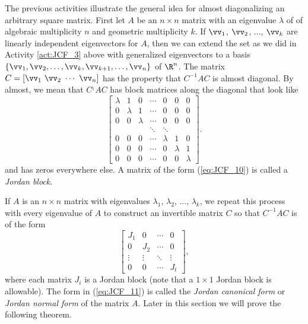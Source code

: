 The previous activities illustrate the general idea for almost diagonalizing an arbitrary square matrix. First let $A$ be an $n \times n$ matrix with an eigenvalue $\lambda$ of  of algebraic multiplicity $n$ and geometric multiplicity $k$. If $\vv_1$, $\vv_2$, $\ldots$, $\vv_k$ are linearly independent eigenvectors for $A$, then we can extend the set as we did in Activity \ref{act:JCF_3} above with generalized eigenvectors to a basis $\{\vv_1, \vv_2, \ldots, \vv_k, \vv_{k+1}, \ldots, \vv_n\}$ of $\R^n$. The matrix $C = [\vv_1 \ \vv_2 \ \cdots \ \vv_n]$ has the property that $C^{-1}AC$ is almost diagonal. By almost, we mean that $C^{_1}AC$ has block matrices along the diagonal that look like 
\begin{equation} \label{eq:JCF_10}
\left[ \begin{array}{ccccccc} \lambda&1&0 &\cdots&0&0&0 \\ 0&\lambda&1&\cdots&0&0&0 \\ 0&0&\lambda&\cdots&0&0&0 \\ &&&\ddots&\ddots&& \\ 0&0&0&\cdots&\lambda&1&0 \\ 0&0&0&\cdots&0&\lambda&1 \\  0&0&0&\cdots&0&0&\lambda \end{array} \right].
\end{equation}
and has zeros everywhere else. A matrix of the form (\ref{eq:JCF_10}) is called a \emph{Jordan block}. 

If $A$ is an $n \times n$ matrix with eigenvalues $\lambda_1$, $\lambda_2$, $\ldots$, $\lambda_k$, we repeat this process with every eigenvalue of $A$ to construct an invertible matrix $C$ so that $C^{-1}AC$ is of the form
 \begin{equation} \label{eq:JCF_11}
\left[ \begin{array}{cccc} J_1&0&\cdots&0 \\ 0&J_2&\cdots&0 \\ \vdots&\vdots&\ddots&\vdots \\ 0&0&\cdots&J_t \end{array} \right],
\end{equation}
where each matrix $J_i$ is a Jordan block (note that a $1 \times 1$ Jordan block is allowable). The form in (\ref{eq:JCF_11}) is called the \emph{Jordan canonical form} or \emph{Jordan normal form} of the matrix $A$. Later in this section we will prove the following theorem.

